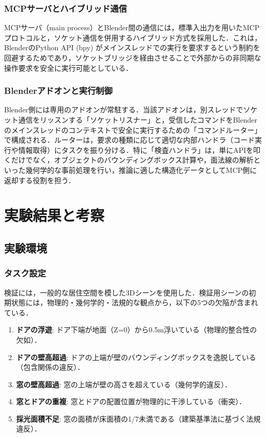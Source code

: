 \documentclass[dvipdfmx, a4paper, 9pt]{deimj}
\begin{document}
\subsubsection{MCPサーバとハイブリッド通信}

MCPサーバ（main process）とBlender間の通信には，標準入出力を用いたMCPプロトコルと，ソケット通信を併用するハイブリッド方式を採用した．これは，BlenderのPython API (bpy) がメインスレッドでの実行を要求するという制約を回避するためであり，ソケットブリッジを経由させることで外部からの非同期な操作要求を安全に実行可能としている．

\subsubsection{Blenderアドオンと実行制御}

Blender側には専用のアドオンが常駐する．当該アドオンは，別スレッドでソケット通信をリッスンする「ソケットリスナー」と，受信したコマンドをBlenderのメインスレッドのコンテキストで安全に実行するための「コマンドルーター」で構成される．ルーターは，要求の種類に応じて適切な内部ハンドラ（コード実行や情報取得）にタスクを振り分ける．特に「検査ハンドラ」は，単にAPIを叩くだけでなく，オブジェクトのバウンディングボックス計算や，面法線の解析といった幾何学的な事前処理を行い，推論に適した構造化データとしてMCP側に返却する役割を担う．

\section{実験結果と考察}

\subsection{実験環境}

\subsubsection{タスク設定}

検証には，一般的な居住空間を模した3Dシーンを使用した．検証用シーンの初期状態には，物理的・幾何学的・法規的な観点から，以下の5つの欠陥が含まれている．

\begin{enumerate}
  \item \textbf{ドアの浮遊}: ドア下端が地面（Z=0）から0.5m浮いている（物理的整合性の欠如）．
  \item \textbf{ドアの壁高超過}: ドアの上端が壁のバウンディングボックスを逸脱している（包含関係の違反）．
  \item \textbf{窓の壁高超過}: 窓の上端が壁の高さを超えている（幾何学的違反）．
  \item \textbf{窓とドアの重複}: 窓とドアの配置位置が物理的に干渉している（衝突）．
  \item \textbf{採光面積不足}: 窓の面積が床面積の1/7未満である（建築基準法に基づく法規違反）．
\end{enumerate}
\end{document}
